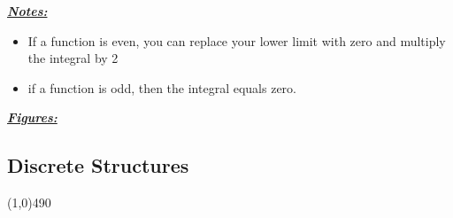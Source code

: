 \documentclass{report}
\begin{document}
      \bigbreak \noindent \bigbreak \noindent
      \textbf{\textit{\underline{Notes:}}}
      \begin{itemize}
        \item If a function is even, you can replace your lower limit with zero and multiply the integral by 2
        \item if a function is odd, then the integral equals zero.
      \end{itemize}

      \bigbreak \noindent \bigbreak \noindent
      \textbf{\textit{\underline{Figures:}}}
      \begin{figure}[ht]
          \centering
          \label{fig:fig1even}
      \end{figure}

      \pagebreak 
      \begin{center}
        \section{Discrete Structures}
      \end{center}
      \line(1,0){490}
      \bigbreak \noindent 
\end{document}
